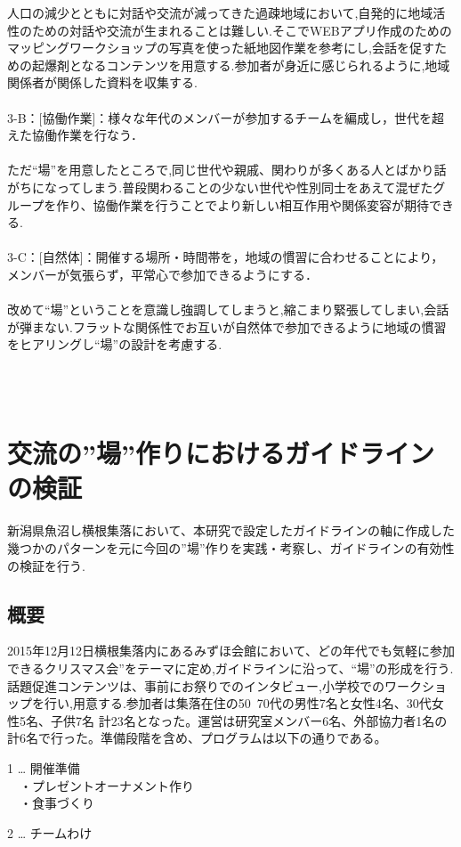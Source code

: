 \documentclass[a4paper]{jsarticle}
\begin{document}
人口の減少とともに対話や交流が減ってきた過疎地域において,自発的に地域活性のための対話や交流が生まれることは難しい.そこでWEBアプリ作成のためのマッピングワークショップの写真を使った紙地図作業を参考にし,会話を促すための起爆剤となるコンテンツを用意する.参加者が身近に感じられるように,地域関係者が関係した資料を収集する.\\\\

3-B：[協働作業]：様々な年代のメンバーが参加するチームを編成し，世代を超えた協働作業を行なう．\\\\
ただ“場”を用意したところで,同じ世代や親戚、関わりが多くある人とばかり話がちになってしまう.普段関わることの少ない世代や性別同士をあえて混ぜたグループを作り、協働作業を行うことでより新しい相互作用や関係変容が期待できる.\\\\
3-C：[自然体]：開催する場所・時間帯を，地域の慣習に合わせることにより，メンバーが気張らず，平常心で参加できるようにする．\\\\
改めて“場”ということを意識し強調してしまうと,縮こまり緊張してしまい,会話が弾まない.フラットな関係性でお互いが自然体で参加できるように地域の慣習をヒアリングし“場”の設計を考慮する.

\\\\

\newpage
\section{交流の”場”作りにおけるガイドラインの検証}
新潟県魚沼し横根集落において、本研究で設定したガイドラインの軸に作成した幾つかのパターンを元に今回の”場”作りを実践・考察し、ガイドラインの有効性の検証を行う.

\subsection{概要}
2015年12月12日横根集落内にあるみずほ会館において、どの年代でも気軽に参加できるクリスマス会”をテーマに定め,ガイドラインに沿って、“場”の形成を行う.話題促進コンテンツは、事前にお祭りでのインタビュー,小学校でのワークショップを行い,用意する.参加者は集落在住の50~70代の男性7名と女性4名、30代女性5名、子供7名 計23名となった。運営は研究室メンバー6名、外部協力者1名の計6名で行った。準備段階を含め、プログラムは以下の通りである。\\

\item 1 … 開催準備\\
　・プレゼントオーナメント作り\\
　・食事づくり
\item 2 … チームわけ
\end{document}
